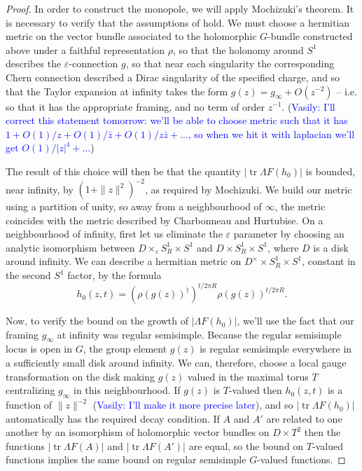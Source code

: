 \documentclass[11pt, oneside, reqno]{amsart}
\theoremstyle{definition} \newtheorem{definition}{Definition}[section]
\theoremstyle{definition} \newtheorem{remark}[definition]{Remark}
\theoremstyle{definition} \newtheorem{remarks}[definition]{Remarks}
\theoremstyle{definition} \newtheorem{question}[definition]{Question}
\theoremstyle{definition} \newtheorem*{note}{Note}
\theoremstyle{definition} \newtheorem{example}[definition]{Example}
\theoremstyle{definition} \newtheorem{examples}[definition]{Examples}
\newcommand{\eps}{\varepsilon}
\DeclareMathOperator{\tr}{tr}
\newcommand{\vasily}[1]{(\textcolor{blue}{Vasily: #1})}
\begin{document}
\begin{proof}
In order to construct the monopole, we will apply Mochizuki's theorem.  It is necessary to verify that the assumptions of \cite[Corollary 3.13]{MochizukiKH} hold.  We must choose a hermitian metric on the vector bundle associated to the holomorphic $G$-bundle constructed above under a faithful representation $\rho$, so that the holonomy around $S^1$ describes the $\eps$-connection $g$, so that near each singularity the corresponding Chern connection described a Dirac singularity of the specified charge, and so that the Taylor expansion at infinity takes the form $g(z) = g_\infty + O(z^{-2})$ -- i.e. so that it has the appropriate framing, and no term of order $z^{-1}$. \vasily{I'll correct this statement tomorrow:
  we'll be able to choose metric such that it has $1 + O(1)/z + O(1)/\bar{z} + O(1)/z \bar{z} + \dots $, so when we hit it with laplacian we'll get $O(1)/|z|^4 + \dots $}



  The result of this choice will then be that the quantity $|\tr \Lambda F(h_0)|$ is bounded, near infinity, by $(1 +\|z\|^2)^{-2}$, as required by Mochizuki.  We build our metric using a partition of unity, so away from a neighbourhood of $\infty$, the metric coincides with the metric described by Charbonneau and Hurtubise.  On a neighbourhood of infinity, first let us eliminate the $\eps$ parameter by choosing an analytic isomorphism between $D \times_\eps S^1_R \times S^1$ and $D \times S^1_R \times S^1$, where $D$ is a disk around infinity.  We can describe a hermitian metric on $D^\times \times S^1_R \times S^1$, constant in the second $S^1$ factor, by the formula
\[h_0(z,t) = (\rho(g(z))^\dagger)^{t/2\pi R}\rho(g(z))^{t/2\pi R}.\]

Now, to verify the bound on the growth of $|\Lambda F(h_0)|$, we'll use the fact that our framing $g_\infty$ at infinity was regular semisimple.  Because the regular semisimple locus is open in $G$, the group element $g(z)$ is regular semisimple everywhere in a sufficiently small disk around infinity.  We can, therefore, choose a local gauge transformation on the disk making $g(z)$ valued in the maximal torus $T$ centralizing $g_\infty$ in this neighbourhood.  If $g(z)$ is $T$-valued then $h_0(z,t)$ is a function of $\|z\|^{-2}$ \vasily{I'll make it more precise later}, and so $|\tr \Lambda F(h_0)|$ automatically has the required decay condition.  If $A$ and $A'$ are related to one another by an isomorphism of holomorphic vector bundles on $D \times T^2$ then the functions $|\tr \Lambda F(A)|$ and $|\tr \Lambda F(A')|$ are equal, so the bound on $T$-valued functions implies the same bound on regular semisimple $G$-valued functions.


\end{proof}
\end{document}
